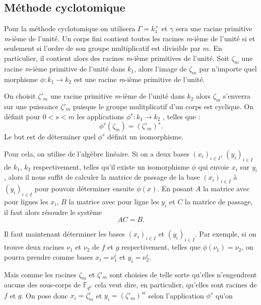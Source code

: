 \documentclass[a4paper]{article} %
\numberwithin{section}{part}
\numberwithin{equation}{section}
\newcommand\nroot[1]{\textit{#1}-ième}
\newcommand\GF[1]{\mathbb{F}_{#1}}
\begin{document}
\subsection{Méthode cyclotomique}

Pour la méthode cyclotomique on utilisera $\Gamma = k_1^{\times}$ et $\gamma$ 
sera une racine primitive \nroot{m} de l'unité.
Un corps fini contient toutes les racines \nroot{m} de l'unité si et seulement 
si l'ordre de son groupe multiplicatif est divisible par $m$. En particulier, il
contient alors des racines \nroot{m} primitives de l'unité. Soit $\zeta_m$ une
racine \nroot{m} primitive de l'unité dans $k_1$, alors l'image de $\zeta_m$ par
n'importe quel morphisme $\phi : k_1 \to k_2$ est une racine \nroot{m} primitive
de l'unité.\par
On choisit $\zeta'_m$ une racine primitive \nroot{m} de l'unité dans $k_2$
alors $\zeta_m$ s'enverra sur une puissance $\zeta'_m$ puisque le groupe 
mulitplicatif d'un corps est cyclique. On définit pour $0 < s < m$ les
applications $\phi^s : k_1 \to k_2$ , telles que :
\begin{equation}
\phi^s(\zeta_m) = (\zeta'_m)^s.
\end{equation}
Le but est de déterminer quel $\phi^s$ définit un isomorphisme.\par
Pour cela, on utilise de l'algèbre linéaire. Si on a deux bases 
$(x_i)_{i\in I}$, $(y_i)_{i\in I}$ de $k_1$, $k_2$ respectivement, telles 
qu'il existe un isomorphisme $\phi$ qui envoie $x_i$ sur $y_i$, alors il nous
suffit de calculer la matrice de passage de la base $(x_i)_{i\in I}$ à
$(y_i)_{i\in I}$ pour pouvoir déterminer ensuite $\phi(x)$. En posant $A$ la
matrice avec pour lignes les $x_i$, $B$ la matrice avec pour ligne les $y_i$ et
$C$ la matrice de passage, il faut alors résoudre le système 
\begin{equation}
AC = B.
\end{equation}
\par
Il faut maintenant déterminer les bases $(x_i)_{i\in I}$ et $(y_i)_{i\in I}$. 
Par exemple, si on trouve deux racines $\nu_1$ et $\nu_2$ de $f$ et $g$ 
respectivement, telles que $\phi(\nu_1) = \nu_2$, on pourra prendre comme bases 
$x_i = \nu_1^i$ et $y_i = \nu_2^i$.\par
Mais comme les racines $\zeta_m$ et $\zeta'_m$ sont choisies de telle sorte 
qu'elles n'engendrent aucuns des sous-corps de $\GF{q^n}$ cela veut 
dire, en particulier, qu'elles sont racines de $f$ et $g$. On pose donc 
$x_i = \zeta_m^i$ et $y_i = (\zeta'_m)^{si}$ selon l'application $\phi^s$ qu'on 
\end{document}
